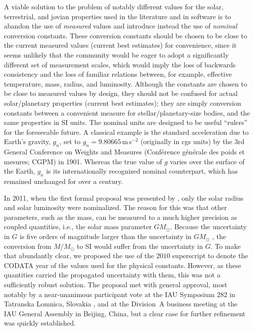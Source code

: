 \documentclass[preprint]{aastex}
\newcommand{\rev}[1]{{#1}}
\begin{document}
A viable solution to the problem of notably different values for the solar, terrestrial, and jovian properties used in the literature and in software is to \rev{abandon} the use of \emph{measured} values and introduce \rev{instead} the use of \emph{nominal} conversion constants. These conversion constants should be chosen to be close to the current measured values (current best estimates) for convenience, since it seems unlikely that the community would be eager to adopt a significantly different set of measurement scales, which would imply the loss of backwards consistency and the loss of familiar relations between, for example, effective temperature, mass, radius, and luminosity. Although the constants are chosen to be close to measured values by design, they should not be confused for actual solar/planetary properties (current best estimates); they are simply conversion constants between a convenient measure for stellar/planetary-size bodies, and the same properties in SI units. The nominal units are designed to be useful ``rulers'' for the foreseeable future. A classical example is the standard acceleration due to Earth's gravity, $g_n$, set to $g_n = 9.80665$\,m\,s${}^{-2}$ (originally in cgs units) by the 3rd General Conference on Weights and Measures (Conf\' erence g\' en\' erale des poids et mesures; CGPM) in 1901. Whereas the true value of $g$ varies over the surface of the Earth, $g_n$ is its internationally recognized nominal counterpart, which has remained unchanged for over a century.

In 2011, when the first formal proposal was presented by \citeauthor{harmanec2011}, only the solar radius and solar luminosity were nominalized. The reason for this was that other parameters, such as the mass, can be measured to a much higher precision as coupled quantities, i.e., the solar mass parameter $GM_\odot$. Because the uncertainty in $G$ is \rev{five} orders of magnitude larger than the uncertainty in $GM_\odot$ \citep[e.g.,][]{petit2010, luzum2011}, the conversion from $M/M_\odot$ to SI would suffer from the uncertainty in $G$. To make that abundantly clear, we proposed the use of the $2010$ superscript to denote the CODATA year of the values used for the physical constants. However, as these quantities carried the propagated uncertainty with them, this was not a sufficiently robust solution. The proposal met with general approval, most notably by a near-unanimous participant vote at the IAU Symposium 282 in Tatranska Lomnica, Slovakia \citep{prsa2012, richards2012}, and at the Division~A business meeting at the IAU General Assembly in Beijing, China, but a clear case for further refinement was quickly established.
\end{document}
